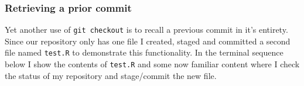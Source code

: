 \documentclass[
  letterpaper,
  DIV=11,
  numbers=noendperiod]{scrreprt}
\newenvironment{Shaded}{\begin{snugshade}}{\end{snugshade}}
\newcommand{\NormalTok}[1]{\textcolor[rgb]{0.00,0.23,0.31}{#1}}
\begin{document}
\begin{Shaded}
\end{Shaded}

\hypertarget{retrieving-a-prior-commit}{%
\subsubsection{Retrieving a prior
commit}\label{retrieving-a-prior-commit}}

Yet another use of \texttt{git\ checkout} is to recall a previous commit
in it's entirety. Since our repository only has one file I created,
staged and committed a second file named \texttt{test.R} to demonstrate
this functionality. In the terminal sequence below I show the contents
of \texttt{test.R} and some now familiar content where I check the
status of my repository and stage/commit the new file.
\end{document}
